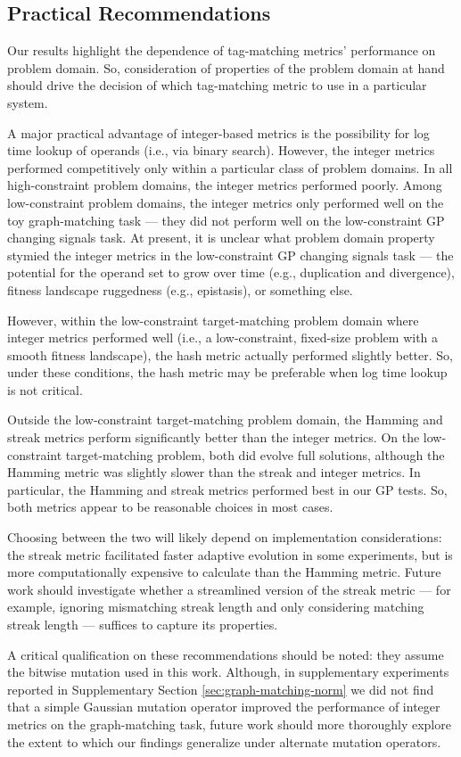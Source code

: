 \subsection{Practical Recommendations}

Our results highlight the dependence of tag-matching metrics' performance on problem domain.
So, consideration of properties of the problem domain at hand should drive the decision of which tag-matching metric to use in a particular system.

A major practical advantage of integer-based metrics is the possibility for log time lookup of operands (i.e., via binary search).
However, the integer metrics performed competitively only within a particular class of problem domains.
In all high-constraint problem domains, the integer metrics performed poorly.
Among low-constraint problem domains, the integer metrics only performed well on the toy graph-matching task --- they did not perform well on the low-constraint GP changing signals task.
At present, it is unclear what problem domain property stymied the integer metrics in the low-constraint GP changing signals task --- the potential for the operand set to grow over time (e.g., duplication and divergence), fitness landscape ruggedness (e.g., epistasis), or something else.

However, within the low-constraint target-matching problem domain where integer metrics performed well (i.e., a low-constraint, fixed-size problem with a smooth fitness landscape), the hash metric actually performed slightly better.
So, under these conditions, the hash metric may be preferable when log time lookup is not critical.

Outside the low-constraint target-matching problem domain, the Hamming and streak metrics perform significantly better than the integer metrics.
On the low-constraint target-matching problem, both did evolve full solutions, although the Hamming metric was slightly slower than the streak and integer metrics.
In particular, the Hamming and streak metrics performed best in our GP tests.
So, both metrics appear to be reasonable choices in most cases.

Choosing between the two will likely depend on implementation considerations: the streak metric facilitated faster adaptive evolution in some experiments, but is more computationally expensive to calculate than the Hamming metric.
Future work should investigate whether a streamlined version of the streak metric --- for example, ignoring mismatching streak length and only considering matching streak length --- suffices to capture its properties.

A critical qualification on these recommendations should be noted: they assume the bitwise mutation used in this work.
Although, in supplementary experiments reported in Supplementary Section \ref{sec:graph-matching-norm} we did not find that a simple Gaussian mutation operator improved the performance of integer metrics on the graph-matching task, future work should more thoroughly explore the extent to which our findings generalize under alternate mutation operators.

